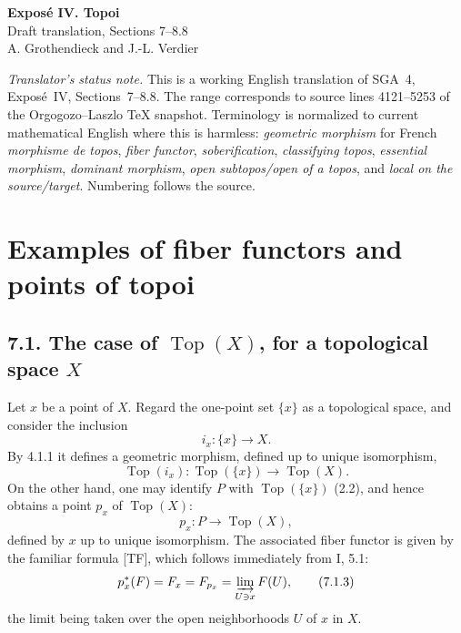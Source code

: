 \documentclass[11pt]{article}
\newcommand{\Top}{\operatorname{Top}}
\begin{document}
\begin{center}
{\Large \textbf{Expos\'e IV. Topoi}}\\[0.35em]
{\large Draft translation, Sections 7--8.8}\\[0.35em]
A. Grothendieck and J.-L. Verdier
\end{center}

\bigskip

\noindent\emph{Translator's status note.} This is a working English translation of SGA~4, Expos\'e~IV, Sections~7--8.8. The range corresponds to source lines 4121--5253 of the Orgogozo--Laszlo TeX snapshot. Terminology is normalized to current mathematical English where this is harmless: \emph{geometric morphism} for French \emph{morphisme de topos}, \emph{fiber functor}, \emph{soberification}, \emph{classifying topos}, \emph{essential morphism}, \emph{dominant morphism}, \emph{open subtopos/open of a topos}, and \emph{local on the source/target}. Numbering follows the source.

\setcounter{section}{6}
\section{Examples of fiber functors and points of topoi}

\subsection*{7.1. The case of \(\Top(X)\), for a topological space \(X\)}

Let \(x\) be a point of \(X\). Regard the one-point set \(\{x\}\) as a topological space, and consider the inclusion
\[
i_x:\{x\}\longrightarrow X.
\]
By 4.1.1 it defines a geometric morphism, defined up to unique isomorphism,
\begin{equation*}
\Top(i_x):\Top(\{x\})\longrightarrow\Top(X).\tag{7.1.1}
\end{equation*}
On the other hand, one may identify \(P\) with \(\Top(\{x\})\) (2.2), and hence obtains a point \(p_x\) of \(\Top(X)\):
\begin{equation*}
p_x:P\longrightarrow\Top(X),\tag{7.1.2}
\end{equation*}
defined by \(x\) up to unique isomorphism. The associated fiber functor is given by the familiar formula [TF], which follows immediately from I, 5.1:
\begin{equation*}
p_x^*(F)=F_x=F_{p_x}=\varinjlim_{U\ni x}F(U),\tag{7.1.3}
\end{equation*}
the limit being taken over the open neighborhoods \(U\) of \(x\) in \(X\).
\end{document}
